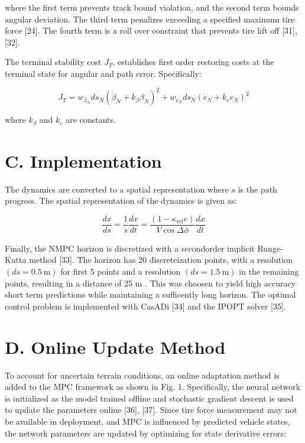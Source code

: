 \documentclass[10pt]{article}
\begin{document}
where the first term prevents track bound violation, and the second term bounds angular deviation. The third term penalizes exceeding a specified maximum tire force [24]. The fourth term is a roll over constraint that prevents tire lift off [31], [32].

The terminal stability cost $J_{T}$, establishes first order restoring costs at the terminal state for angular and path error. Specifically:


\begin{equation*}
J_{T}=w_{\beta_{N}} d s_{N}\left(\dot{\beta}_{N}+k_{\beta} \beta_{N}\right)^{2}+w_{e_{N}} d s_{N}\left(\dot{e}_{N}+k_{e} e_{N}\right)^{2} \tag{19}
\end{equation*}


where $k_{\beta}$ and $k_{e}$ are constants.

\section*{C. Implementation}
The dynamics are converted to a spatial representation where $s$ is the path progress. The spatial representation of the dynamics is given as:


\begin{equation*}
\frac{d x}{d s}=\frac{1}{\dot{s}} \frac{d x}{d t}=\frac{\left(1-\kappa_{\mathrm{ref}} e\right)}{V \cos \Delta \phi} \frac{d x}{d t} \tag{20}
\end{equation*}


Finally, the NMPC horizon is discretized with a secondorder implicit Runge-Kutta method [33]. The horizon has 20 discreteization points, with a resolution $(d s=0.5 \mathrm{~m})$ for first 5 points and a resolution $(d s=1.5 \mathrm{~m})$ in the remaining points, resulting in a distance of 25 m . This was choosen to yield high accuracy short term predictions while maintaining a sufficently long horizon. The optimal control problem is implemented with CasADi [34] and the IPOPT solver [35].

\section*{D. Online Update Method}
To account for uncertain terrain conditions, an online adaptation method is added to the MPC framework as shown in Fig. 1. Specifically, the neural network is initialized as the model trained offline and stochastic gradient descent is used to update the parameters online [36], [37]. Since tire force measurement may not be available in deployment, and MPC is influenced by predicted vehicle states, the network parameters are updated by optimizing for state derivative errors:
\end{document}
